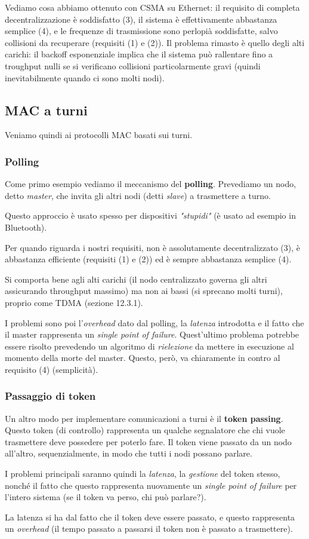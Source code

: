 \documentclass[a4paper,11pt]{article}
\begin{document}
Vediamo cosa abbiamo ottenuto con CSMA su Ethernet: il requisito di completa decentralizzazione è soddisfatto (3), il sistema è effettivamente abbastanza semplice (4), e le frequenze di trasmissione sono perlopià soddisfatte, salvo collisioni da recuperare (requisiti (1) e (2)). Il problema rimasto è quello degli alti carichi: il backoff esponenziale implica che il sistema può rallentare fino a troughput nulli se si verificano collisioni particolarmente gravi (quindi inevitabilmente quando ci sono molti nodi). 

\subsection{MAC a turni}
Veniamo quindi ai protocolli MAC basati sui turni.

\subsubsection{Polling}
Come primo esempio vediamo il meccanismo del \textbf{polling}.
Prevediamo un nodo, detto \textit{master}, che invita gli altri nodi (detti \textit{slave}) a trasmettere a turno.

Questo approccio è usato spesso per dispositivi \textit{"stupidi"} (è usato ad esempio in Bluetooth).

Per quando riguarda i nostri requisiti, non è assolutamente decentralizzato (3), è abbastanza efficiente (requisiti (1) e (2)) ed è sempre abbastanza semplice (4).

Si comporta bene agli alti carichi (il nodo centralizzato governa gli altri assicurando throughput massimo) ma non ai bassi (si sprecano molti turni), proprio come TDMA (sezione 12.3.1).

I problemi sono poi l'\textit{overhead} dato dal polling, la \textit{latenza} introdotta e il fatto che il master rappresenta un \textit{single point of failure}.
Quest'ultimo problema potrebbe essere risolto prevedendo un algoritmo di \textit{rielezione} da mettere in esecuzione al momento della morte del master.
Questo, però, va chiaramente in contro al requisito (4) (semplicità).

\subsubsection{Passaggio di token}
Un altro modo per implementare comunicazioni a turni è il \textbf{token passing}.
Questo token (di controllo) rappresenta un qualche segnalatore che chi vuole trasmettere deve possedere per poterlo fare.
Il token viene passato da un nodo all'altro, sequenzialmente, in modo che tutti i nodi possano parlare.

I problemi principali saranno quindi la \textit{latenza}, la \textit{gestione} del token stesso, nonché il fatto che questo rappresenta nuovamente un \textit{single point of failure} per l'intero sistema (se il token va perso, chi può parlare?).

La latenza si ha dal fatto che il token deve essere passato, e questo rappresenta un \textit{overhead} (il tempo passato a passarsi il token non è passato a trasmettere).
\end{document}
